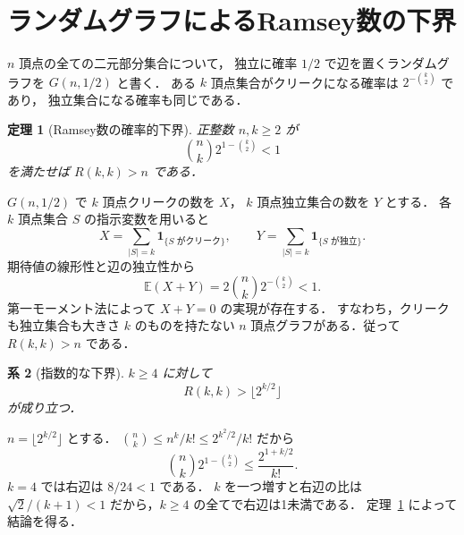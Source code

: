 \documentclass[a5paper,10pt,onecolumn]{jsarticle}
\makeatletter
\theoremstyle{mathnotetheorem}
\newtheorem{theorem}{定理}[section]
\newtheorem{corollary}[theorem]{系}
\renewcommand{\proofname}{証明}
\renewenvironment{proof}[1][\proofname]{%
  \par\pushQED{\qed}\normalfont\topsep4\p@\@plus2\p@\relax
  \trivlist\item[\hskip\labelsep\bfseries #1]\ignorespaces
}{\popQED\endtrivlist\@endpefalse}
\makeatother
\begin{document}
\section{ランダムグラフによるRamsey数の下界}
$n$ 頂点の全ての二元部分集合について，
独立に確率 $1/2$ で辺を置くランダムグラフを
$G(n,1/2)$ と書く．
ある $k$ 頂点集合がクリークになる確率は
$2^{-{k\choose2}}$ であり，
独立集合になる確率も同じである．

\begin{theorem}[Ramsey数の確率的下界]\label{thm:ramseylower}
正整数 $n,k\ge2$ が
\begin{equation}\label{eq:ramseylowercondition}
 {n\choose k}2^{1-{k\choose2}}<1
\end{equation}
を満たせば $R(k,k)>n$ である．
\end{theorem}
\begin{proof}
$G(n,1/2)$ で $k$ 頂点クリークの数を $X$，
$k$ 頂点独立集合の数を $Y$ とする．
各 $k$ 頂点集合 $S$ の指示変数を用いると
\[
 X=\sum_{|S|=k}\mathbf1_{\{S\text{ がクリーク}\}},
 \qquad
 Y=\sum_{|S|=k}\mathbf1_{\{S\text{ が独立}\}}.
\]
期待値の線形性と辺の独立性から
\[
 \mathbb E(X+Y)=2{n\choose k}2^{-{k\choose2}}<1.
\]
第一モーメント法によって $X+Y=0$ の実現が存在する．
すなわち，クリークも独立集合も大きさ $k$ のものを持たない
$n$ 頂点グラフがある．従って $R(k,k)>n$ である．
\end{proof}

\begin{corollary}[指数的な下界]
$k\ge4$ に対して
\[
 R(k,k)>\lfloor 2^{k/2}\rfloor
\]
が成り立つ．
\end{corollary}
\begin{proof}
$n=\lfloor2^{k/2}\rfloor$ とする．
${n\choose k}\le n^k/k!\le2^{k^2/2}/k!$ だから
\[
 {n\choose k}2^{1-{k\choose2}}
 \le \frac{2^{1+k/2}}{k!}.
\]
$k=4$ では右辺は $8/24<1$ である．
$k$ を一つ増すと右辺の比は
$\sqrt2/(k+1)<1$ だから，$k\ge4$ の全てで右辺は1未満である．
定理~\ref{thm:ramseylower} によって結論を得る．
\end{proof}
\end{document}
